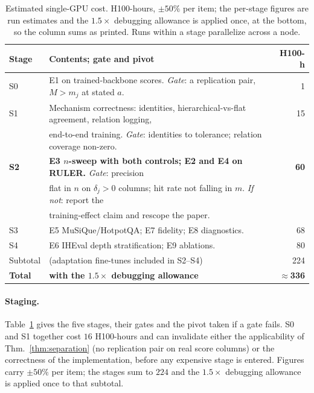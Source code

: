 \documentclass{article}
\begin{document}
\begin{table}[h]
\centering
\caption{Estimated single-GPU cost. H100-hours, $\pm50\%$ per item; the per-stage figures are
run estimates and the $1.5\times$ debugging allowance is applied once, at the bottom, so the
column sums as printed. Runs within a stage parallelize across a node.}
\label{tab:compute}
\footnotesize
\setlength{\tabcolsep}{4pt}
\begin{tabular}{@{}llr@{}}
\toprule
\textbf{Stage} & \textbf{Contents; gate and pivot} & \textbf{H100-h} \\
\midrule
S0 & E1 on trained-backbone scores. \emph{Gate}: a replication pair, $M>m_j$ at stated $a$. & 1 \\
S1 & Mechanism correctness: identities, hierarchical-vs-flat agreement, relation logging, & 15 \\
   & end-to-end training. \emph{Gate}: identities to tolerance; relation coverage non-zero. & \\
\textbf{S2} & \textbf{E3 $n$-sweep with both controls; E2 and E4 on RULER.} \emph{Gate}: precision & \textbf{60} \\
   & flat in $n$ on $\delta_j>0$ columns; hit rate not falling in $m$. \emph{If not}: report the & \\
   & training-effect claim and rescope the paper. & \\
S3 & E5 MuSiQue/HotpotQA; E7 fidelity; E8 diagnostics. & 68 \\
S4 & E6 IHEval depth stratification; E9 ablations. & 80 \\
\midrule
\midrule
Subtotal & (adaptation fine-tunes included in S2--S4) & 224 \\
\textbf{Total} & \textbf{with the $1.5\times$ debugging allowance} & \textbf{$\approx$336} \\
\bottomrule
\end{tabular}
\end{table}


\paragraph{Staging.} Table~\ref{tab:compute} gives the five stages, their gates
and the pivot taken if a gate fails. S0 and S1 together cost $16$ H100-hours and can invalidate
either the applicability of Thm.~\ref{thm:separation} (no replication pair on real score columns)
or the correctness of the implementation, before any expensive stage is entered. Figures carry
$\pm50\%$ per item; the stages sum to $224$ and the $1.5\times$ debugging allowance is applied
once to that subtotal.
\end{document}
